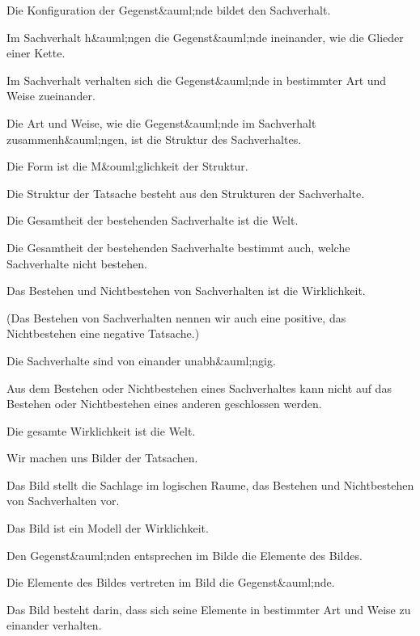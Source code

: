 {Die Konfiguration der Gegenst&auml;nde bildet den
Sachverhalt.}


{Im Sachverhalt h&auml;ngen die Gegenst&auml;nde ineinander,
wie die Glieder einer Kette.}


{Im Sachverhalt verhalten sich die Gegenst&auml;nde
in bestimmter Art und Weise zueinander.}


{Die Art und Weise, wie die Gegenst&auml;nde im
Sachverhalt zusammenh&auml;ngen, ist die Struktur
des Sachverhaltes.}


{Die Form ist die M&ouml;glichkeit der Struktur.}


{Die Struktur der Tatsache besteht aus den
Strukturen der Sachverhalte.}


{Die Gesamtheit der bestehenden Sachverhalte
ist die Welt.}


{Die Gesamtheit der bestehenden Sachverhalte
bestimmt auch, welche Sachverhalte nicht bestehen.}


{Das Bestehen und Nichtbestehen von Sachverhalten
ist die Wirklichkeit.

(Das Bestehen von Sachverhalten nennen wir
auch eine positive, das Nichtbestehen eine negative
Tatsache.)}


{Die Sachverhalte sind von einander unabh&auml;ngig.}


{Aus dem Bestehen oder Nichtbestehen eines
Sachverhaltes kann nicht auf das Bestehen oder
Nichtbestehen eines anderen geschlossen werden.}


{Die gesamte Wirklichkeit ist die Welt.}


{Wir machen uns Bilder der Tatsachen.}


{Das Bild stellt die Sachlage im logischen Raume,
das Bestehen und Nichtbestehen von Sachverhalten
vor.}


{Das Bild ist ein Modell der Wirklichkeit.}


{Den Gegenst&auml;nden entsprechen im Bilde die
Elemente des Bildes.}


{Die Elemente des Bildes vertreten im Bild die
Gegenst&auml;nde.}


{Das Bild besteht darin, dass sich seine Elemente
in bestimmter Art und Weise zu einander verhalten.}


